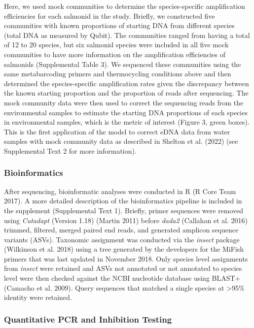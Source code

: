 \documentclass[
]{article}
\begin{document}
Here, we used mock communities to determine the species-specific
amplification efficiencies for each salmonid in the study. Briefly, we
constructed five communities with known proportions of starting DNA from
different species (total DNA as measured by Qubit). The communities
ranged from having a total of 12 to 20 species, but six salmonid species
were included in all five mock communities to have more information on
the amplification efficiencies of salmonids (Supplemental Table 3). We
sequenced these communities using the same metabarcoding primers and
thermocycling conditions above and then determined the species-specific
amplification rates given the discrepancy between the known starting
proportion and the proportion of reads after sequencing. The mock
community data were then used to correct the sequencing reads from the
environmental samples to estimate the starting DNA proportions of each
species in environmental samples, which is the metric of interest
(Figure 3, green boxes). This is the first application of the model to
correct eDNA data from water samples with mock community data as
described in Shelton et al. (2022) (see Supplemental Text 2 for more
information).

\hypertarget{bioinformatics}{%
\subsubsection{Bioinformatics}\label{bioinformatics}}

After sequencing, bioinformatic analyses were conducted in R (R Core
Team 2017). A more detailed description of the bioinformatics pipeline
is included in the supplement (Supplemental Text 1). Briefly, primer
sequences were removed using \emph{Cutadapt} (Version 1.18) (Martin
2011) before \emph{dada2} (Callahan et al. 2016) trimmed, filtered,
merged paired end reads, and generated amplicon sequence variants
(ASVs). Taxonomic assignment was conducted via the \emph{insect} package
(Wilkinson et al. 2018) using a tree generated by the developers for the
MiFish primers that was last updated in November 2018. Only species
level assignments from \emph{insect} were retained and ASVs not
annotated or not annotated to species level were then checked against
the NCBI nucleotide database using BLAST+ (Camacho et al. 2009). Query
sequences that matched a single species at \textgreater95\% identity
were retained.

\hypertarget{quantitative-pcr-and-inhibition-testing}{%
\subsubsection{Quantitative PCR and Inhibition
Testing}\label{quantitative-pcr-and-inhibition-testing}}
\end{document}
